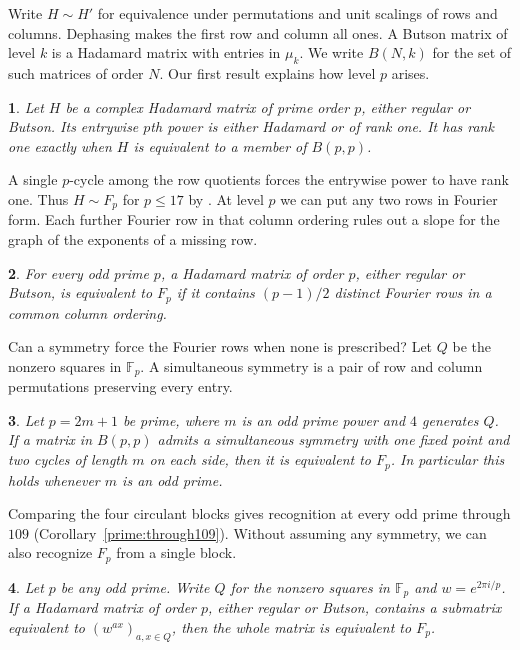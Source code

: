\documentclass[11pt,a4paper]{article}
\newtheorem*{introstatement}{\introheading}
\newenvironment{introtheorem}[2]
  {\Needspace{5\baselineskip}\begin{samepage}%
   \def\introheading{\hyperref[#2]{Theorem~#1}}%
   \begin{introstatement}}
  {\end{introstatement}\end{samepage}}
\numberwithin{equation}{section}
\begin{document}
Write $H\sim H'$ for equivalence under permutations and unit scalings of rows and columns. Dephasing makes the first row and column all ones. A Butson matrix of level $k$ is a Hadamard matrix with entries in $\mu_k$. We write $B(N,k)$ for the set of such matrices of order $N$. Our first result explains how level $p$ arises.

\begin{introtheorem}{I}{prime:power}
Let $H$ be a complex Hadamard matrix of prime order $p$, either regular or Butson. Its entrywise $p$th power is either Hadamard or of rank one. It has rank one exactly when $H$ is equivalent to a member of $B(p,p)$.
\end{introtheorem}

A single $p$-cycle among the row quotients forces the entrywise power to have rank one. Thus $H\sim F_p$ for $p\le17$ by \cite{hkm}. At level $p$ we can put any two rows in Fourier form. Each further Fourier row in that column ordering rules out a slope for the graph of the exponents of a missing row.

\begin{introtheorem}{II}{prime:fourierrows}
For every odd prime $p$, a Hadamard matrix of order $p$, either regular or Butson, is equivalent to $F_p$ if it contains $(p-1)/2$ distinct Fourier rows in a common column ordering.
\end{introtheorem}

Can a symmetry force the Fourier rows when none is prescribed? Let $Q$ be the nonzero squares in $\mathbb F_p$. A simultaneous symmetry is a pair of row and column permutations preserving every entry.

\begin{introtheorem}{III}{prime:twoorbit}
Let $p=2m+1$ be prime, where $m$ is an odd prime power and $4$ generates $Q$. If a matrix in $B(p,p)$ admits a simultaneous symmetry with one fixed point and two cycles of length $m$ on each side, then it is equivalent to $F_p$. In particular this holds whenever $m$ is an odd prime.
\end{introtheorem}

Comparing the four circulant blocks gives recognition at every odd prime through $109$ (Corollary~\ref{prime:through109}). Without assuming any symmetry, we can also recognize $F_p$ from a single block.

\begin{introtheorem}{IV}{prime:bare}
Let $p$ be any odd prime. Write $Q$ for the nonzero squares in $\mathbb F_p$ and $w=e^{2\pi i/p}$. If a Hadamard matrix of order $p$, either regular or Butson, contains a submatrix equivalent to $(w^{ax})_{a,x\in Q}$, then the whole matrix is equivalent to $F_p$.
\end{introtheorem}
\end{document}
